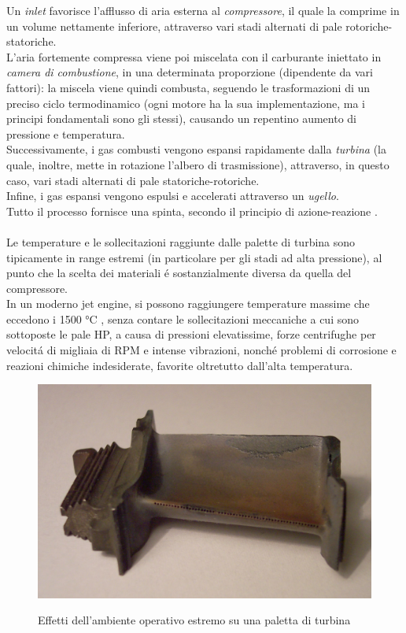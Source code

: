 \documentclass{article}
\begin{document}
    Un \textit{inlet} favorisce l'afflusso di aria esterna al \textit{compressore}, il quale
    la comprime in un volume nettamente inferiore, attraverso vari stadi alternati di pale rotoriche-statoriche.\\
    L'aria fortemente compressa viene poi miscelata con il carburante iniettato in \textit{camera di combustione},
    in una determinata proporzione (dipendente da vari fattori): la miscela viene quindi combusta, seguendo le trasformazioni di
    un preciso ciclo termodinamico (ogni motore ha la sua implementazione, ma i principi fondamentali sono gli stessi), causando un repentino
    aumento di pressione e temperatura.\\
    Successivamente, i gas combusti vengono espansi rapidamente dalla \textit{turbina} (la quale, inoltre, mette in rotazione l'albero di trasmissione), attraverso, in questo caso,
    vari stadi alternati di pale statoriche-rotoriche.\\
    Infine, i gas espansi vengono espulsi e accelerati attraverso un \textit{ugello}.\\
    Tutto il processo fornisce una spinta, secondo il principio di azione-reazione \autocite*{Aircr_engine_design}.\\ \\
    Le temperature e le sollecitazioni raggiunte dalle palette di turbina sono tipicamente in range estremi (in particolare per gli stadi ad alta pressione),
    al punto che la scelta dei materiali é sostanzialmente diversa da quella del compressore.\\
    In un moderno jet engine, si possono raggiungere temperature massime che eccedono i 1500 °C \autocite*{SciencePubGroup}, 
    senza contare le sollecitazioni meccaniche a cui sono sottoposte le pale HP, a causa di pressioni elevatissime,
    forze centrifughe per velocitá di migliaia di RPM e intense vibrazioni, nonché problemi di corrosione
    e reazioni chimiche indesiderate, favorite oltretutto dall'alta temperatura.\\

    \begin{figure}[h!]
        \centering
        \includegraphics[width=\textwidth]{Sources/Turbinenschaufel_RB199.jpg}
        \caption{Effetti dell'ambiente operativo estremo su una paletta di turbina \autocite*{turbine_blade}}
         \label{fig:paletta_logorata}
    \end{figure}
\end{document}
